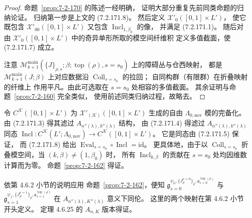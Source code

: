 \begin{proof}
命题~\ref{prop:7-2-170} 的陈述一经明确，
证明大部分重复先前同类命题的归纳论证。
归纳第一步是上文的 (7.2.171.8)。
然后定义 $\mathcal X'_0([0,1]\times L')$，
使它既包含 $\mathcal X'_{00}([0,1]\times L')$
又包含 $\operatorname{Incl}_{1,\beta_0}$ 的像，
并满足 (7.2.171.1)。
随后对由 $\mathcal X'_0([0,1]\times L')$
中的奇异单形所取的模空间纤维积
定义多值截面，使 (7.2.171.7) 成立。

注意
$\mathcal M_{k+1}^{\mathrm{main}}
(\{J\}_{\rho,s};\beta;
\operatorname{top}(\rho),s=s_0)$
上的障碍丛与仓西映射，
都是 $\mathcal M_{k+1}^{\mathrm{main}}(J;\beta)$
上对应数据沿 $\operatorname{Coll}_{s=s_0}$ 的拉回；
自同构群（有限群）在折叠映射的纤维上
作用平凡。由此可选取在 $s=s_0$ 处相容的多值截面。
其余证明与命题~\ref{prop:7-2-160} 完全类似，
使用前述同类归纳过程，故略去。
\end{proof}

令 $C^{\mathcal K}([0,1]\times L')$
为 $\mathcal X'_{(\mathcal K)}([0,1]\times L')$
生成的自由 $\Lambda_{0,\mathrm{nov}}$ 模的完备化。
由 (7.2.171.3) 得其滤过
$A_{n''(\lambda),k''(\lambda)}$ 结构，
由 (7.2.171.4) 得滤过
$A_{n''(\lambda),k''(\lambda)}$ 同态
$\operatorname{Incl}\colon
C^{\mathcal K}(L';\Lambda_{0,\mathrm{nov}})
\to C^{\mathcal K}([0,1]\times L')$。
它是同态由 (7.2.171.5) 保证，
而 (7.2.171.8) 给出
$\operatorname{Eval}_{s=s_0}\circ
\operatorname{Incl}=\mathrm{id}$。
更具体地，由于以 $\operatorname{Coll}_{s=s_0}$
折叠模空间，当 $(k,\beta)\ne(1,\beta_0)$ 时，
所有 $\operatorname{Incl}_{k,\beta}$
的贡献在 $s=s_0$ 处均因维数计算而为零。
命题~\ref{prop:7-2-162} 得证。

依第 4.6.2 小节的说明应用
命题~\ref{prop:7-2-162}，便知
$\mathfrak g_{s=0}^{\psi_0,\{J^{s=0}_\rho\}_\rho,
\mathfrak s^{\operatorname{top}(\rho)}_{s=0}}$
与
$\mathfrak g_{s=1}^{\psi_1,\{J^{s=1}_\rho\}_\rho,
\mathfrak s^{\operatorname{top}(\rho)}_{s=1}}$
在 $A_{n''(\lambda),K''(\lambda)}$ 意义下同伦。
这里的两个映射在第 4.6.2 小节开头定义。
定理 4.6.25 的 $A_{n,K}$ 版本得证。

